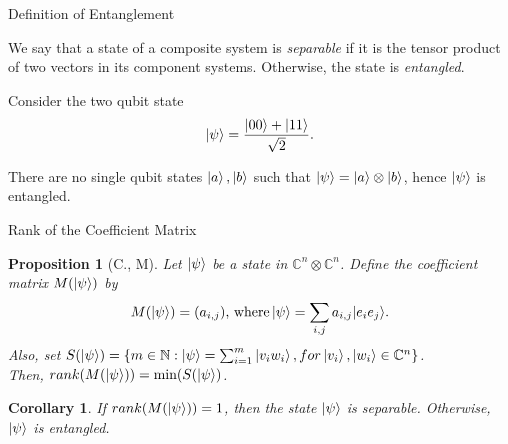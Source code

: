 \documentclass[handout, 10 pt]{beamer}
\newtheorem{prop}{Proposition}
\newtheorem{corol}{Corollary}
\begin{document}
\begin{comment}
Informally, when two states are entangled, one cannot be described physically independent of the other.  In practice, we may think of entangled states as being {\emph{correlated}} in the sense that information about one of them is in fact, information about both of them. 
\end{comment}
\begin{frame}{Definition of Entanglement}
 \begin{definition}\label{definition: entanglement with state vector}
We say that a state of a composite system is \textit{separable} if it is the tensor product of two vectors in its component systems. Otherwise, the state is \textit{entangled}.
\end{definition}   
\pause

\begin{example} \label{example: entangled state}
Consider the two qubit state 
\begin{equation}
    \ket{\psi}=\frac{\ket{00}+\ket{11}}{\sqrt{2}}.
\end{equation}

There are no single qubit states $\ket{a}, \ket{b}$ such that $\ket{\psi}=\ket{a}\otimes \ket{b}$, hence $\ket{\psi}$ is entangled.
\end{example}
\end{frame}

\begin{frame}{Rank of the Coefficient Matrix}
\begin{prop} [C., M]
\label{rank prop}
Let $\ket{\psi}$ be a state in $\mathbb{C}^n \otimes \mathbb{C}^n$. Define the coefficient matrix $M(\ket{\psi})$ by
\begin{equation}
M(\ket{\psi})=(a_{i,j}) \textrm{, where}\ket{\psi}=\sum\limits_{i,j}a_{i,j}|e_i e_j\rangle . 
\end{equation}
Also, set $S(\ket{\psi})=\{m\in \mathbb{N}: \ket{\psi}=\sum_{i=1}^m\ket{v_i w_i}, for \ket{v_i}, \ket{w_i} \in \mathbb{C}^n\}$.\\  Then, $rank(M(\ket{\psi}))=\textrm{min} (S(\ket{\psi})$.
\end{prop}
\pause

\begin{corol}
If $rank(M(\ket{\psi}))=1$, then the state $\ket{\psi}$ is separable. Otherwise, $\ket{\psi}$ is entangled.
\end{corol}
\end{frame}
\end{document}
